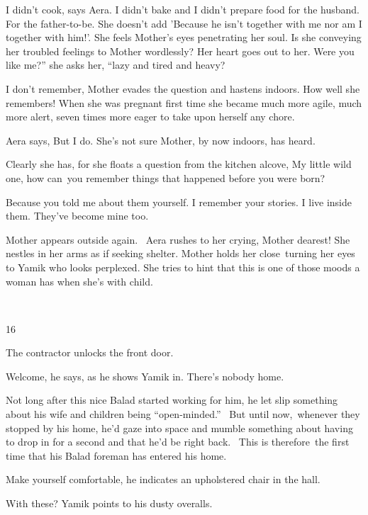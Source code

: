 \documentclass[letterpaper]{article}
\begin{document}
{\textquotedbl}I didn't cook,{\textquotedbl} says Aera. {\textquotedbl}I didn't bake and I didn't prepare food for the
husband. For the father-to-be.{\textquotedbl} She doesn't add 'Because he isn't together with me nor am I together with
him!'. She feels Mother's eyes penetrating her soul. Is she conveying her troubled feelings to Mother wordlessly? Her
heart goes out to her. {\textquotedbl}Were you like me?'' she asks her, ``lazy and tired and heavy?{\textquotedbl} 

{\textquotedbl}I don't remember,{\textquotedbl} Mother evades the question and hastens indoors. How well she remembers!
When she was pregnant first time she became much more agile, much more alert, seven times more eager to take upon
herself any chore.~~~ 

Aera says, {\textquotedbl}But I do.{\textquotedbl} She's not sure Mother, by now indoors, has heard. 

Clearly she has, for she floats a question from the kitchen alcove, {\textquotedbl}My little wild one, how can~you
remember things that happened before you were born?{\textquotedbl} 

{\textquotedbl}Because you told me about them yourself. I remember your stories. I live inside them. They've become mine
too.{\textquotedbl}

Mother appears outside again. ~Aera rushes to her crying, {\textquotedbl}Mother dearest!{\textquotedbl} She nestles in
her arms as if seeking shelter. Mother holds her close~turning her eyes to Yamik who looks perplexed. She tries to hint
that this is one of those moods a woman has when she's with child. 

~

16 

The contractor unlocks the front door. 

{\textquotedbl}Welcome,{\textquotedbl} he says, as he shows Yamik in. {\textquotedbl}There's nobody home.{\textquotedbl}


Not long after this nice Balad started working for him, he let slip something about his wife and children being
``open-minded.'' \ But until now,~whenever they stopped by his home, he'd gaze into space and mumble something about
having to drop in for a second and that he'd be right back. ~This is therefore~the first time that his Balad foreman
has entered his home.

{\textquotedbl}Make yourself comfortable,{\textquotedbl} he indicates an upholstered chair in the hall.~ 

{\textquotedbl}With these?{\textquotedbl} Yamik points to his dusty overalls. 
\end{document}
